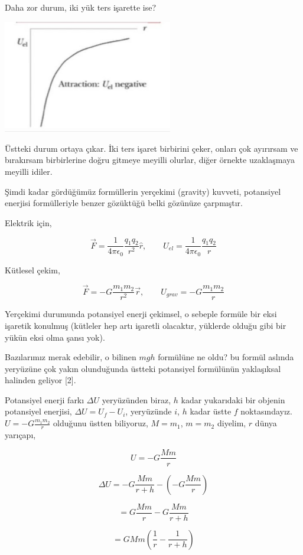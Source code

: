 \documentclass[12pt,fleqn]{article}\usepackage{../../common}
\begin{document}
Daha zor durum, iki yük ters işarette ise? 

\includegraphics[width=20em]{08_06.jpg}

Üstteki durum ortaya çıkar. İki ters işaret birbirini çeker, onları çok
ayırırsam ve bırakırsam birbirlerine doğru gitmeye meyilli olurlar, diğer
örnekte uzaklaşmaya meyilli idiler. 

Şimdi kadar gördüğümüz formüllerin yerçekimi (gravity) kuvveti, potansiyel
enerjisi formülleriyle benzer gözüktüğü belki gözünüze çarpmıştır.

Elektrik için,

$$
\vec{F} = \frac{1}{4 \pi \epsilon_0} \frac{q_1 q_2}{r^2}\hat{r}, \qquad
U_{el} = \frac{1}{4 \pi \epsilon_0} \frac{q_1 q_2}{r}
$$

Kütlesel çekim,

$$
\vec{F} = -G \frac{m_1 m_2}{r^2} \vec{r}, \qquad
U_{grav} = -G \frac{m_1 m_2}{r}
$$

Yerçekimi durumunda potansiyel enerji çekimsel, o sebeple formüle bir eksi
işaretik konulmuş (kütleler hep artı işaretli olacaktır, yüklerde olduğu gibi
bir yükün eksi olma şansı yok).

Bazılarımız merak edebilir, o bilinen $mgh$ formülüne ne oldu? bu formül aslında
yeryüzüne çok yakın olunduğunda üstteki potansiyel formülünün yaklaşıksal
halinden geliyor [2]. 

Potansiyel enerji farkı $\Delta U$ yeryüzünden biraz, $h$ kadar yukarıdaki bir
objenin potansiyel enerjisi, $\Delta U = U_f - U_i$, yeryüzünde $i$, $h$ kadar
üstte $f$ noktasındayız. $U = -G \frac{m_1 m_2}{r}$ olduğunu üstten biliyoruz,
$M = m_1$, $m=m_2$ diyelim, $r$ dünya yarıçapı,

$$
U = -G \frac{M m}{r}
$$

$$
\Delta U = -G \frac{M m}{r+h} - (-G \frac{M m}{r})
$$

$$
=  G \frac{M m}{r} -G \frac{M m}{r+h}
$$

$$
= GMm \left( \frac{1}{r} - \frac{1}{r+h} \right)
$$
\end{document}
